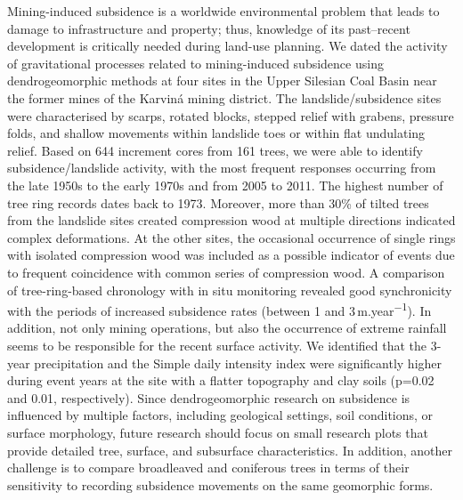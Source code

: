 {Mining-induced subsidence is a worldwide environmental problem that leads to damage to infrastructure and property; thus, knowledge of its past–recent development is critically needed during land-use planning. We dated the activity of gravitational processes related to mining-induced subsidence using dendrogeomorphic methods at four sites in the Upper Silesian Coal Basin near the former mines of the Karviná mining district. The landslide/subsidence sites were characterised by scarps, rotated blocks, stepped relief with grabens, pressure folds, and shallow movements within landslide toes or within flat undulating relief. Based on 644 increment cores from 161 trees, we were able to identify subsidence/landslide activity, with the most frequent responses occurring from the late 1950s to the early 1970s and from 2005 to 2011. The highest number of tree ring records dates back to 1973. Moreover, more than 30\% of tilted trees from the landslide sites created compression wood at multiple directions indicated complex deformations. At the other sites, the occasional occurrence of single rings with isolated compression wood was included as a possible indicator of events due to frequent coincidence with common series of compression wood. A comparison of tree-ring-based chronology with in situ monitoring revealed good synchronicity with the periods of increased subsidence rates (between 1 and 3 m.year\textsuperscript{−1}). In addition, not only mining operations, but also the occurrence of extreme rainfall seems to be responsible for the recent surface activity. We identified that the 3-year precipitation and the Simple daily intensity index were significantly higher during event years at the site with a flatter topography and clay soils (p=0.02 and 0.01, respectively). Since dendrogeomorphic research on subsidence is influenced by multiple factors, including geological settings, soil conditions, or surface morphology, future research should focus on small research plots that provide detailed tree, surface, and subsurface characteristics. In addition, another challenge is to compare broadleaved and coniferous trees in terms of their sensitivity to recording subsidence movements on the same geomorphic forms.
}%
{}%

